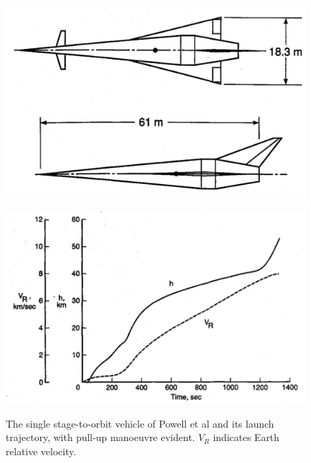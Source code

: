   	\begin{figure}[h]
  		\centering
  		\begin{minipage}[b]{0.3\textwidth}
  			\centering
  			\includegraphics[width=\linewidth]{"figures/2_literature-review/Powell Vehicle"}
  			
  			\label{fig:PowellVehicle}
  		\end{minipage}	
  		\begin{minipage}[b]{0.6\textwidth}
  			\includegraphics[width=\linewidth]{"figures/2_literature-review/Powell Trajectory"}
  			
  			\label{fig:PowellTrajectory}
  		\end{minipage}
  		\caption{The single stage-to-orbit vehicle of Powell et al\cite{Powell1991} and its launch trajectory, with pull-up manoeuvre evident. $V_R$ indicates Earth relative velocity. }
  		\label{fig:Powell}
  	\end{figure}
